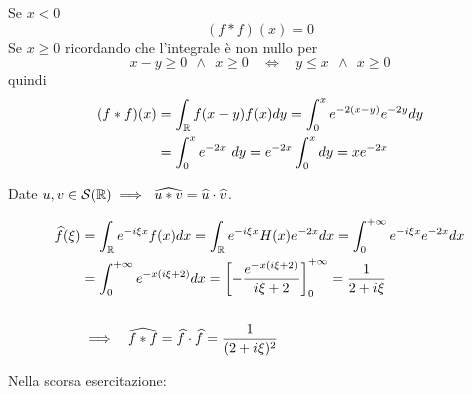 Se $x < 0$
\begin{equation*}
(f*f)(x) = 0
\end{equation*}
Se $x\geq 0$ ricordando che l'integrale è non nullo per 
\begin{equation*}
x - y\geq 0\ \ \land \ \ x\geq 0\ \ \ \ \iff \ \ \ \ y\leq x\ \ \land \ \ x\geq 0
\end{equation*}
quindi
\begin{align*}
(f*f)(x) & = \int _{\mathbb{R} } f(x - y) f(x) dy = \int ^{x}_{0} e^{ - 2(x - y)} e^{ - 2y} dy\\
 & = \int ^{x}_{0} e^{ - 2x} \ dy = e^{ - 2x}\int ^{x}_{0} dy = xe^{ - 2x}
\end{align*}
\begin{thm}
Date $\displaystyle u,v\in \mathcal{S} (\mathbb{R}) \implies \ \widehat{u*v} = \widehat{u} \cdot \widehat{v}$.
\end{thm}
\begin{align*}
\widehat{f}(\xi) & = \int _{\mathbb{R} } e^{ - i\xi x} f(x) dx = \int _{\mathbb{R} } e^{ - i\xi x} H(x) e^{ - 2x} dx = \int ^{ + \infty }_{0} e^{ - i\xi x} e^{ - 2x} dx\\
 & = \int ^{ + \infty }_{0} e^{ - x(i\xi + 2)} dx = \left[ - \frac{e^{ - x(i\xi + 2)}}{i\xi + 2}\right]^{ + \infty }_{0} = \frac{1}{2 + i\xi }\\
 & \\
 & \implies \ \ \widehat{f*f} = \widehat{f} \cdot \widehat{f} = \frac{1}{(2 + i\xi)^{2}}
\end{align*}
\Soluzione

Nella scorsa esercitazione:

